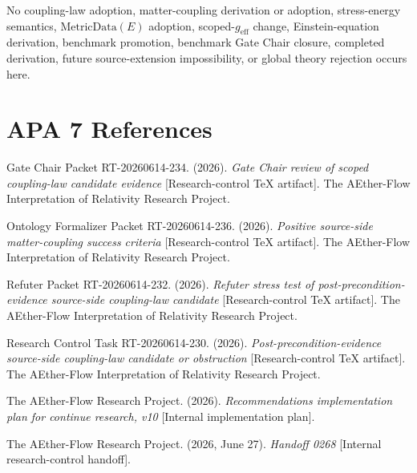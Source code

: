 \documentclass[11pt]{article}
\newcommand{\geff}{g_{\mathrm{eff}}}
\newcommand{\MetricData}{\mathrm{MetricData}}
\begin{document}
No coupling-law adoption, matter-coupling derivation or adoption,
stress-energy semantics, \(\MetricData(E)\) adoption, scoped-\(\geff\) change,
Einstein-equation derivation, benchmark promotion, benchmark Gate Chair
closure, completed derivation, future source-extension impossibility, or
global theory rejection occurs here.

\section{APA 7 References}

Gate Chair Packet RT-20260614-234. (2026). \emph{Gate Chair review of scoped
coupling-law candidate evidence} [Research-control TeX artifact]. The
AEther-Flow Interpretation of Relativity Research Project.

Ontology Formalizer Packet RT-20260614-236. (2026). \emph{Positive
source-side matter-coupling success criteria} [Research-control TeX artifact].
The AEther-Flow Interpretation of Relativity Research Project.

Refuter Packet RT-20260614-232. (2026). \emph{Refuter stress test of
post-precondition-evidence source-side coupling-law candidate}
[Research-control TeX artifact]. The AEther-Flow Interpretation of Relativity
Research Project.

Research Control Task RT-20260614-230. (2026). \emph{Post-precondition-evidence
source-side coupling-law candidate or obstruction} [Research-control TeX
artifact]. The AEther-Flow Interpretation of Relativity Research Project.

The AEther-Flow Research Project. (2026). \emph{Recommendations implementation
plan for continue research, v10} [Internal implementation plan].

The AEther-Flow Research Project. (2026, June 27). \emph{Handoff 0268}
[Internal research-control handoff].
\end{document}
